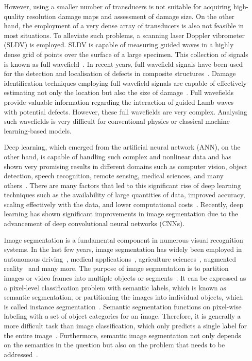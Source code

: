 \begin{sloppypar}
	However, using a smaller number of transducers is not suitable for acquiring high-quality resolution damage maps and assessment of damage size.
	On the other hand, the employment of a very dense array of transducers is also not feasible in most situations. 
	To alleviate such problems, a scanning laser Doppler vibrometer (SLDV) is employed.
	SLDV is capable of measuring guided waves in a highly dense grid of points over the surface of a large specimen.
	This collection of signals is known as full wavefield~\cite{Radzienski2019a}. 
	In recent years, full wavefield signals have been used for the detection and localisation of defects in composite
	structures~\cite{Radzienski2019a, Girolamo2018a, kudela2018impact,  rogge2013characterization}.
	Damage identification techniques employing full wavefield signals are capable of effectively estimating not only the location but also the size of damage~\cite{Girolamo2018a, kudela2018impact}.
	Full wavefields provide valuable information regarding the interaction of guided Lamb waves with potential defects.
	However, these full wavefields are very complex.
	Analysing such wavefields is very difficult for conventional physics or classical machine learning-based models.
	
	Deep learning, which emerged from the artificial neural network (ANN), on 
	the other hand, is capable of handling such complex and nonlinear data and 
	has shown very promising results in different domains such as computer 
	vision, object detection, speech recognition, remote sensing, medical 
	sciences, and many others~\cite{mohanty2016using, zhang2020well, 
	pashaei2020review}.
	There are many factors that led to this significant rise of deep learning 
	techniques such as the availability of large quantities of data, improved 
	accuracy, scaling effectively with the data, and lower computational 
	costs~\cite{pu2021automatic, wang2020big}.
	Recently, deep learning has shown significant improvements in image 
	segmentation due to the advancement of deep convolutional neural networks 
	(CNNs).
	
	Image segmentation is a fundamental component in numerous visual recognition
	systems. In the last few years, image segmentation has widely been
	employed in autonomous driving~\cite{ros2016synthia, li2018real}, medical applications~\cite{taghanaki2021deep}, agriculture sciences~\cite{milioto2018real}, augmented reality~\cite{miksik2015semantic} and many more. 
	The purpose of image segmentation is to partition images or video frames into multiple objects or segments~\cite{szeliski2010computer}.
	It can be expressed as a pixel-level classification problem with semantic labels, which is known as semantic segmentation, or partitioning the images into individual objects, which is called instance segmentation~\cite{szeliski2010computer, minaee2021image}. 
	Semantic segmentation functions on pixel-wise labeling with a set of object categories for an image. 
	Therefore, it is generally a more difficult task than image classification, which only predicts a single label for the entire image~\cite{minaee2021image}.
	Furthermore, semantic image segmentation not only depends on the semantics in the question but also on the problem that needs to be addressed~\cite{ghosh2019understanding}.
	

\end{sloppypar}
